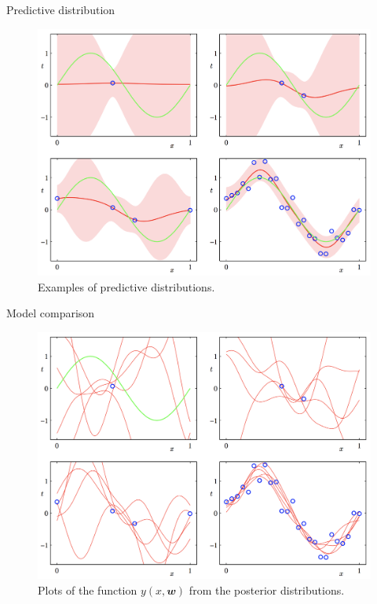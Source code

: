 \documentclass{bredelebeamer}
\begin{document}
\begin{frame}{Predictive distribution}
  \begin{figure}
  \centering
  \includegraphics[scale=0.25]{posterior_prediction.png}
  \caption{
    Examples of predictive distributions.
  }
  \end{figure}
\end{frame}

\begin{frame}{Model comparison}
  \begin{figure}
  \centering
  \includegraphics[scale=0.25]{bayesian_model_samples.png}
  \caption{
    Plots of the function $y(x, \mathbfit{w})$ from the posterior distributions.
  }
  \end{figure}
\end{frame}
\end{document}
